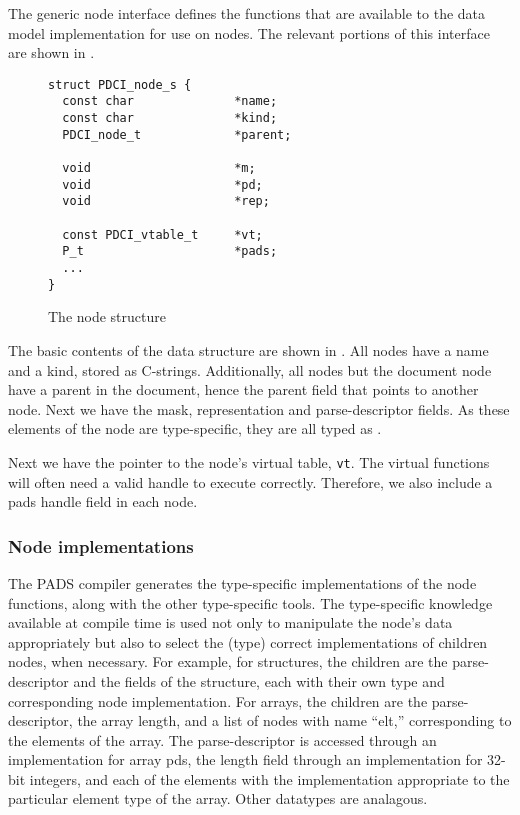 {The generic node interface defines the functions that are available to the
\pads{} data model implementation for use on nodes. The relevant portions of
this interface are shown in .

\begin{figure}
{\small
\begin{verbatim}
struct PDCI_node_s {
  const char              *name;
  const char              *kind;
  PDCI_node_t             *parent;

  void                    *m;
  void                    *pd;
  void                    *rep;

  const PDCI_vtable_t     *vt;
  P_t                     *pads;
  ...
}
\end{verbatim}
}
\caption{The node structure}
\label{fig:node-struct}
\end{figure}

The basic contents of the  data structure are shown in
. All nodes have a name and a kind, stored as
C-strings. Additionally, all nodes but the document node have a parent
in the document, hence the parent field that points to another node.
Next we have the mask, representation and parse-descriptor fields. As
these elements of the node are type-specific, they are all typed as
\vptr.

Next we have the pointer to the node's virtual table, {\tt vt}. The
virtual functions will often need a valid \pads{} handle to execute
correctly. Therefore, we also include a pads handle field in each
node.

\subsubsection{Node implementations}
The PADS compiler generates the type-specific implementations of the
node functions, along with the other type-specific tools.  The
type-specific knowledge available at compile time is used not only to
manipulate the node's data appropriately but also to select the (type)
correct implementations of children nodes, when necessary.  For
example, for structures, the children are the parse-descriptor and the
fields of the structure, each with their own type and corresponding
node implementation.  For arrays, the children are the
parse-descriptor, the array length, and a list of nodes with name
``elt,'' corresponding to the elements of the array. The
parse-descriptor is accessed through an implementation for array pds,
the length field through an implementation for 32-bit integers, and
each of the elements with the implementation appropriate to the
particular element type of the array. Other datatypes are analagous.

}
